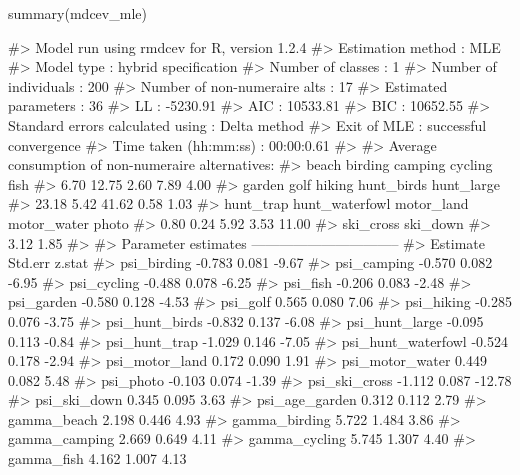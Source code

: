 \begin{Schunk}
\begin{Sinput}
summary(mdcev_mle)
\end{Sinput}
\begin{Soutput}
#> Model run using rmdcev for R, version 1.2.4 
#> Estimation method                : MLE
#> Model type                       : hybrid specification
#> Number of classes                : 1
#> Number of individuals            : 200
#> Number of non-numeraire alts     : 17
#> Estimated parameters             : 36
#> LL                               : -5230.91
#> AIC                              : 10533.81
#> BIC                              : 10652.55
#> Standard errors calculated using : Delta method
#> Exit of MLE                      : successful convergence
#> Time taken (hh:mm:ss)            : 00:00:0.61
#> 
#> Average consumption of non-numeraire alternatives:
#>          beach        birding        camping        cycling           fish 
#>           6.70          12.75           2.60           7.89           4.00 
#>         garden           golf         hiking     hunt_birds     hunt_large 
#>          23.18           5.42          41.62           0.58           1.03 
#>      hunt_trap hunt_waterfowl     motor_land    motor_water          photo 
#>           0.80           0.24           5.92           3.53          11.00 
#>      ski_cross       ski_down 
#>           3.12           1.85 
#> 
#> Parameter estimates --------------------------------  
#>                      Estimate Std.err z.stat
#> psi_birding            -0.783   0.081  -9.67
#> psi_camping            -0.570   0.082  -6.95
#> psi_cycling            -0.488   0.078  -6.25
#> psi_fish               -0.206   0.083  -2.48
#> psi_garden             -0.580   0.128  -4.53
#> psi_golf                0.565   0.080   7.06
#> psi_hiking             -0.285   0.076  -3.75
#> psi_hunt_birds         -0.832   0.137  -6.08
#> psi_hunt_large         -0.095   0.113  -0.84
#> psi_hunt_trap          -1.029   0.146  -7.05
#> psi_hunt_waterfowl     -0.524   0.178  -2.94
#> psi_motor_land          0.172   0.090   1.91
#> psi_motor_water         0.449   0.082   5.48
#> psi_photo              -0.103   0.074  -1.39
#> psi_ski_cross          -1.112   0.087 -12.78
#> psi_ski_down            0.345   0.095   3.63
#> psi_age_garden          0.312   0.112   2.79
#> gamma_beach             2.198   0.446   4.93
#> gamma_birding           5.722   1.484   3.86
#> gamma_camping           2.669   0.649   4.11
#> gamma_cycling           5.745   1.307   4.40
#> gamma_fish              4.162   1.007   4.13

\end{Soutput}
\end{Schunk}
